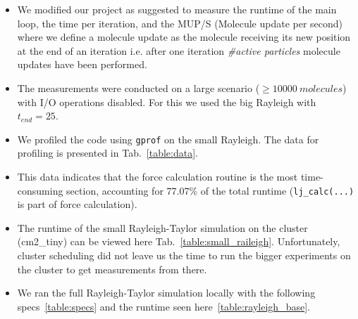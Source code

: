 \documentclass{article}
\begin{document}
\begin{itemize}
    \item We modified our project as suggested to measure the runtime of the main loop, the time per iteration, and the MUP/S (Molecule update per second) where we define a molecule update as the molecule receiving its new position at the end of an iteration i.e. after one iteration \textit{\#active particles} molecule updates have been performed.
    \item The measurements were conducted on a large scenario ($\geq 10000\ molecules$) with I/O operations disabled. For this we used the big Rayleigh with $t_{end} = 25$. 
    \item We profiled the code using \texttt{gprof} on the small Rayleigh. The data for profiling is presented in Tab.\ \ref{table:data}.
    \item This data indicates that the force calculation routine is the most time-consuming section, accounting for 77.07\% of the total runtime (\texttt{lj\_calc(...)} is part of force calculation).
    \item The runtime of the small Rayleigh-Taylor simulation on the cluster (cm2\_tiny) can be viewed here Tab.\ \ref{table:small_raileigh}. Unfortunately, cluster scheduling did not leave us the time to run the bigger experiments on the cluster to get measurements from there.
    \item We ran the full Rayleigh-Taylor simulation locally with the following specs\ \ref{table:specs} and the runtime seen here\ \ref{table:rayleigh_base}.
\end{itemize}
\end{document}
